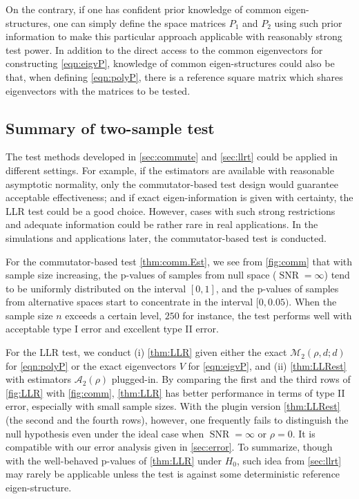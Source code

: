 \documentclass[12pt]{article}
\numberwithin{equation}{section}
\numberwithin{table}{section}
\numberwithin{thm}{section}
\numberwithin{defn}{section}
\numberwithin{lem}{section}
\numberwithin{prop}{section}
\numberwithin{cor}{section}
\numberwithin{rem}{section}
\DeclareMathOperator{\SNR}{SNR}
\begin{document}
\begin{appendix}
On the contrary, if one has confident prior knowledge of common eigen-structures, one can simply define the space matrices $P_1$ and $P_2$ using such prior information to make this particular approach applicable with reasonably strong test power. In addition to the direct access to the common eigenvectors for constructing \eqref{eqn:eigvP}, knowledge of common eigen-structures could also be that, when defining \eqref{eqn:polyP}, there is a reference square matrix which shares eigenvectors with the matrices to be tested.


\subsection{Summary of two-sample test}
The test methods developed in \autoref{sec:commute} and \autoref{sec:llrt} could be applied in different settings. For example, if the estimators are available with reasonable asymptotic normality, only the commutator-based test design would guarantee acceptable effectiveness; and if exact eigen-information is given with certainty, the LLR test could be a good choice. However, cases with such strong restrictions and adequate information could be rather rare in real applications. In the simulations and applications later, the commutator-based test is conducted.

For the commutator-based test \autoref{thm:comm.Est}, we see from \autoref{fig:comm} that with sample size increasing, the p-values of samples from null space ($\SNR = \infty$) tend to be uniformly distributed on the interval $[0,1]$, and the p-values of samples from alternative spaces start to concentrate in the interval $[0, 0.05)$. When the sample size $n$ exceeds a certain level, $250$ for instance, the test performs well with acceptable type I error and excellent type II error.

For the LLR test, we conduct (i) \autoref{thm:LLR} given either the exact $\mathcal{M}_2(\rho,d;d)$ for \eqref{eqn:polyP} or the exact eigenvectors $V$ for \eqref{eqn:eigvP}, and (ii) \autoref{thm:LLRest} with estimators $\mathcal{A}_2(\rho)$ plugged-in. By comparing the first and the third rows of \autoref{fig:LLR} with \autoref{fig:comm}, \autoref{thm:LLR} has better performance in terms of type II error, especially with small sample sizes. With the plugin version \autoref{thm:LLRest} (the second and the fourth rows), however, one frequently fails to distinguish the null hypothesis even under the ideal case when $\SNR = \infty$ or $\rho = 0$. It is compatible with our error analysis given in \autoref{sec:error}. To summarize, though with the well-behaved p-values of \autoref{thm:LLR} under $H_0$, such idea from \autoref{sec:llrt} may rarely be applicable unless the test is against some deterministic reference eigen-structure.


\end{appendix}
\end{document}
